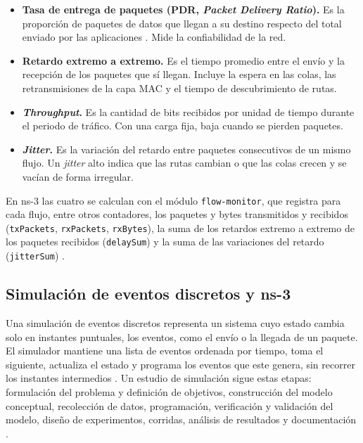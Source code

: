 \begin{itemize}
    \item \textbf{Tasa de entrega de paquetes (PDR, \emph{Packet Delivery Ratio}).} Es la
    proporción de paquetes de datos que llegan a su destino respecto del total enviado
    por las aplicaciones \cite{broch1998performance}. Mide la confiabilidad de la red.
    \item \textbf{Retardo extremo a extremo.} Es el tiempo promedio entre el envío y la
    recepción de los paquetes que sí llegan. Incluye la espera en las colas, las
    retransmisiones de la capa MAC y el tiempo de descubrimiento de rutas.
    \item \textbf{\emph{Throughput}.} Es la cantidad de bits recibidos por unidad de
    tiempo durante el periodo de tráfico. Con una carga fija, baja cuando se pierden
    paquetes.
    \item \textbf{\emph{Jitter}.} Es la variación del retardo entre paquetes consecutivos
    de un mismo flujo. Un \emph{jitter} alto indica que las rutas cambian o que las colas
    crecen y se vacían de forma irregular.
\end{itemize}

En ns-3 las cuatro se calculan con el módulo \texttt{flow-monitor}, que registra para
cada flujo, entre otros contadores, los paquetes y bytes transmitidos y recibidos
(\texttt{txPackets}, \texttt{rxPackets}, \texttt{rxBytes}), la suma de los retardos
extremo a extremo de los paquetes recibidos (\texttt{delaySum}) y la suma de las
variaciones del retardo (\texttt{jitterSum}) \cite{ns3flowmonitor}.

\subsection{Simulación de eventos discretos y ns-3}
\label{sec:marco-ns3}

Una simulación de eventos discretos representa un sistema cuyo estado cambia solo en
instantes puntuales, los eventos, como el envío o la llegada de un paquete. El simulador
mantiene una lista de eventos ordenada por tiempo, toma el siguiente, actualiza el
estado y programa los eventos que este genera, sin recorrer los instantes intermedios
\cite{banks2010discrete}. Un estudio de simulación sigue estas etapas: formulación del
problema y definición de objetivos, construcción del modelo conceptual, recolección de
datos, programación, verificación y validación del modelo, diseño de experimentos,
corridas, análisis de resultados y documentación \cite{banks2010discrete}.

